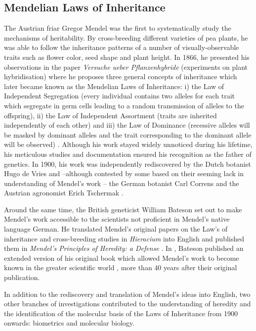 \subsection{Mendelian Laws of Inheritance}
The Austrian friar Gregor Mendel was the first to systematically study the mechanisms of heritability. By cross-breeding different varieties of pea plants, he was able to follow the inheritance patterns of a number of visually-observable traits such as flower color, seed shape and plant height. In 1866, he presented his observations in the paper \textit{Versuche ueber Pflanzenhybride} (experiments on plant hybridisation) where he proposes three general concepts of inheritance which later became known as the Mendelian Laws of Inheritance: i) the Law of Independent Segregation (every individual contains two alleles for each trait which segregate in germ cells leading to a random transmission of alleles to the offspring), ii) the Law of Independent Assortment (traits are inherited independently of each other) and iii) the Law of Dominance (recessive alleles will be masked by dominant alleles and the trait corresponding to the dominant allele will be observed) \citep{Mendel1866}. Although his work stayed widely unnoticed during his lifetime, his meticulous studies and documentation ensured his recognition as the father of genetics. In 1900, his work was independently rediscovered by the Dutch botanist Hugo de Vries \citep[translation into English]{deVries1900,Hannah1950} and --although contested by some based on their seeming lack in understanding of Mendel's work \citep{Keynes2008,Monaghan1986,Monaghan1987}-- the German botanist Carl Correns \citep[translation into English]{Correns1900,Piernick1950} and the Austrian agronomist Erich Tschermak \parencite*{Tschermak1900}. 

Around the same time, the British geneticist William Bateson set out to make Mendel's work accessible to the scientists not proficient in Mendel's native language German. He translated Mendel's original papers on the Law's of inheritance \citep{Mendel1866} and cross-breeding studies in \textit{Hieracium} \citep{Mendel1869} into English and published them in \textit{Mendel's Principles of Heredity: a Defense} \citep{Bateson1902}. In \parencite*{Bateson1909}, Bateson published an extended version of his original book which allowed Mendel's work to become known in the greater scientific world \citep{Keynes2008}, more than 40 years after their original publication.

In addition to the rediscovery and translation of Mendel's ideas into English, two other branches of investigations contributed to the understanding of heredity and the identification of the molecular basis of the Laws of Inheritance from 1900 onwards: biometrics and molecular biology. 

